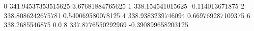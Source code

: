 0 341.94537353515625 3.67681884765625
1 338.154541015625 -0.114013671875
2 338.8086242675781 0.540069580078125
4 338.9383239746094 0.669769287109375
6 338.2685546875 0.0
8 337.8776550292969 -0.390899658203125
